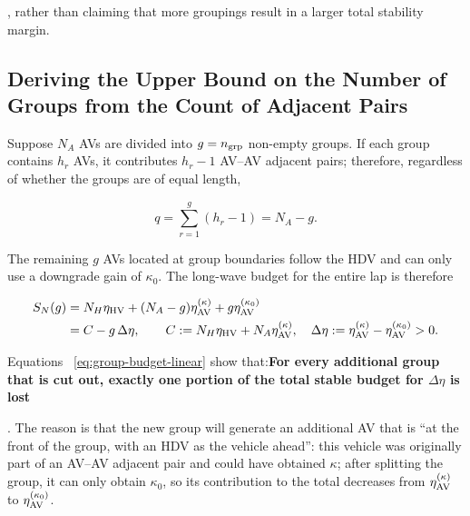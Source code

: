 \documentclass[11pt,a4paper,openany]{book}
\numberwithin{equation}{chapter}
\numberwithin{figure}{chapter}
\numberwithin{table}{chapter}
\begin{document}
, rather than claiming that more groupings result in a larger total stability margin.










\subsection{Deriving the Upper Bound on the Number of Groups from the Count of Adjacent Pairs}










Suppose $N_A$ AVs are divided into $g=n_{\rm grp}$ non-empty groups. If each group contains $h_r$ AVs, it contributes $h_r-1$ AV–AV adjacent pairs; therefore, regardless of whether the groups are of equal length,

\begin{equation}
q=\sum_{r=1}^{g}(h_r-1)=N_A-g.
\label{eq:group-pair-count}
\end{equation}

The remaining $g$ AVs located at group boundaries follow the HDV and can only use a downgrade gain of $\kappa_0$. The long-wave budget for the entire lap is therefore

\begin{align}
S_N(g)
&=N_H\eta_{\rm HV}+(N_A-g)\eta_{\rm AV}^{(\kappa)}
  +g\eta_{\rm AV}^{(\kappa_0)} \\
&=C-g\,\Delta\eta,
\qquad
C:=N_H\eta_{\rm HV}+N_A\eta_{\rm AV}^{(\kappa)},
\quad
\Delta\eta:=\eta_{\rm AV}^{(\kappa)}-\eta_{\rm AV}^{(\kappa_0)}>0.
\label{eq:group-budget-linear}
\end{align}

Equations ~\eqref{eq:group-budget-linear} show that:\textbf{For every additional group that is cut out, exactly one portion of the total stable budget for $\Delta\eta$ is lost}




. The reason is that the new group will generate an additional AV that is “at the front of the group, with an HDV as the vehicle ahead”: this vehicle was originally part of an AV–AV adjacent pair and could have obtained $\kappa$; after splitting the group, it can only obtain $\kappa_0$, so its contribution to the total decreases from $\eta_{\rm AV}^{(\kappa)}$ to $\eta_{\rm AV}^{(\kappa_0)}$.
\end{document}
